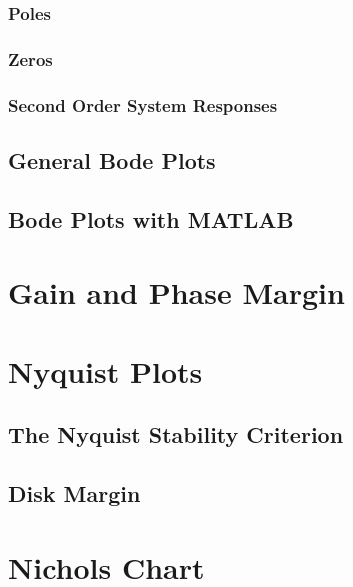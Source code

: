 \subsubsection{Poles}

\subsubsection{Zeros}

\subsubsection{Second Order System Responses}

\subsection{General Bode Plots}

\subsection{Bode Plots with MATLAB}


\section{Gain and Phase Margin}


\section{Nyquist Plots}

\subsection{The Nyquist Stability Criterion}

\subsection{Disk Margin }

\section{Nichols Chart}


\newpage
\printendnotes

